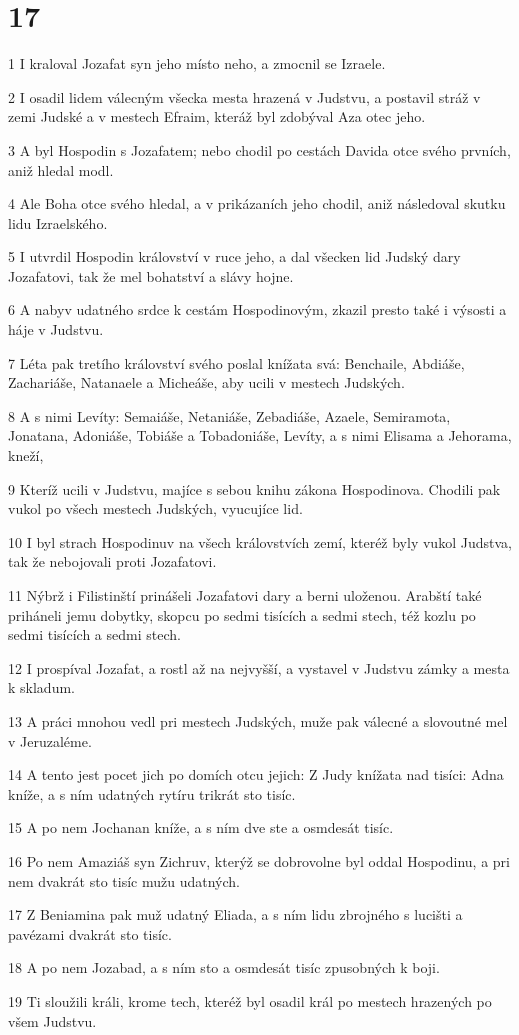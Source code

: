 \chapter{17}

\par 1 I kraloval Jozafat syn jeho místo neho, a zmocnil se Izraele.
\par 2 I osadil lidem válecným všecka mesta hrazená v Judstvu, a postavil stráž v zemi Judské a v mestech Efraim, kteráž byl zdobýval Aza otec jeho.
\par 3 A byl Hospodin s Jozafatem; nebo chodil po cestách Davida otce svého prvních, aniž hledal modl.
\par 4 Ale Boha otce svého hledal, a v prikázaních jeho chodil, aniž následoval skutku lidu Izraelského.
\par 5 I utvrdil Hospodin království v ruce jeho, a dal všecken lid Judský dary Jozafatovi, tak že mel bohatství a slávy hojne.
\par 6 A nabyv udatného srdce k cestám Hospodinovým, zkazil presto také i výsosti a háje v Judstvu.
\par 7 Léta pak tretího království svého poslal knížata svá: Benchaile, Abdiáše, Zachariáše, Natanaele a Micheáše, aby ucili v mestech Judských.
\par 8 A s nimi Levíty: Semaiáše, Netaniáše, Zebadiáše, Azaele, Semiramota, Jonatana, Adoniáše, Tobiáše a Tobadoniáše, Levíty, a s nimi Elisama a Jehorama, kneží,
\par 9 Kteríž ucili v Judstvu, majíce s sebou knihu zákona Hospodinova. Chodili pak vukol po všech mestech Judských, vyucujíce lid.
\par 10 I byl strach Hospodinuv na všech královstvích zemí, kteréž byly vukol Judstva, tak že nebojovali proti Jozafatovi.
\par 11 Nýbrž i Filistinští prinášeli Jozafatovi dary a berni uloženou. Arabští také priháneli jemu dobytky, skopcu po sedmi tisících a sedmi stech, též kozlu po sedmi tisících a sedmi stech.
\par 12 I prospíval Jozafat, a rostl až na nejvyšší, a vystavel v Judstvu zámky a mesta k skladum.
\par 13 A práci mnohou vedl pri mestech Judských, muže pak válecné a slovoutné mel v Jeruzaléme.
\par 14 A tento jest pocet jich po domích otcu jejich: Z Judy knížata nad tisíci: Adna kníže, a s ním udatných rytíru trikrát sto tisíc.
\par 15 A po nem Jochanan kníže, a s ním dve ste a osmdesát tisíc.
\par 16 Po nem Amaziáš syn Zichruv, kterýž se dobrovolne byl oddal Hospodinu, a pri nem dvakrát sto tisíc mužu udatných.
\par 17 Z Beniamina pak muž udatný Eliada, a s ním lidu zbrojného s lucišti a pavézami dvakrát sto tisíc.
\par 18 A po nem Jozabad, a s ním sto a osmdesát tisíc zpusobných k boji.
\par 19 Ti sloužili králi, krome tech, kteréž byl osadil král po mestech hrazených po všem Judstvu.

